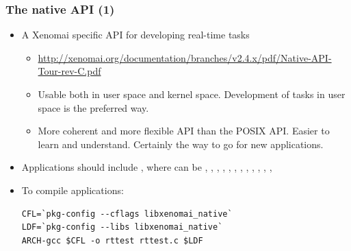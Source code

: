\begin{frame}[fragile]
  \frametitle{The native API (1)}
  \begin{itemize}
  \item A Xenomai specific API for developing real-time tasks
    \begin{itemize}
    \item {\small
      \url{http://xenomai.org/documentation/branches/v2.4.x/pdf/Native-API-Tour-rev-C.pdf}}
    \item Usable both in user space and kernel space. Development of
      tasks in user space is the preferred way.
    \item More coherent and more flexible API than the POSIX
      API. Easier to learn and understand. Certainly the way to go for
      new applications.
    \end{itemize}
  \item Applications should include , where
     can be , , ,
    , , , , ,
    , , , , 
  \item To compile applications:
    \begin{block}{}
\small
\begin{verbatim}
CFL=`pkg-config --cflags libxenomai_native`
LDF=`pkg-config --libs libxenomai_native`
ARCH-gcc $CFL -o rttest rttest.c $LDF
\end{verbatim}
\normalsize
    \end{block}
  \end{itemize}
\end{frame}

